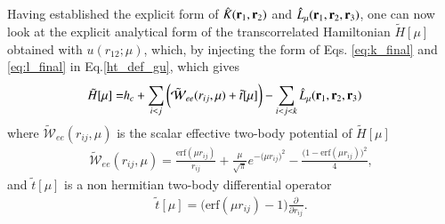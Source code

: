 \documentclass[aip,jcp,reprint,noshowkeys,superscriptaddress]{revtex4-1}
\newcommand{\deriv}[3]{\frac{\partial^{#3} #1}{\partial {#2}^{#3}}}
\newcommand{\bri}[1]{{\bf r}_{#1}}
\begin{document}
Having established the explicit form of $\hat{K}(\bri{1},\bri{2})$ and $\hat{L}_\mu(\bri{1},\bri{2},\bri{3})$, one can now 
look at the explicit analytical form of the transcorrelated Hamiltonian $\tilde{H}[\mu]$ obtained with $u(r_{12};\mu)$,  
which, by injecting the form of Eqs. \eqref{eq:k_final} and \eqref{eq:l_final} in Eq.\eqref{ht_def_gu}, which gives
\begin{equation}
  \begin{aligned}
 \label{eq:exp_ht_mu}
   \tilde{H}[\mu] = & h_c + \sum_{i<j} \bigg( \tilde{\mathcal{W}}_{ee}(r_{ij},\mu) + \tilde{t}[\mu] \bigg) - \sum_{i<j<k} \hat{L}_\mu(\bri{1},\bri{2},\bri{3})
  \end{aligned}
\end{equation}
where $ \tilde{\mathcal{W}}_{ee}(r_{ij},\mu)$ is the scalar effective two-body potential of  $\tilde{H}[\mu]$
\begin{equation}
 \begin{aligned}
 \tilde{\mathcal{W}}_{ee}(r_{ij},\mu)  =  \frac{\text{erf}(\mu r_{ij})}{r_{ij}} + \frac{\mu}{\sqrt{\pi}} e^{-\big(\mu r_{ij} \big)^2} - \frac{\bigg(1 -     \text{erf}(\mu r_{ij}) \bigg)^2}{4}, 
 \end{aligned}
\end{equation}
and $\tilde{t}[\mu]$ is a non hermitian two-body differential operator 
\begin{equation}
 \begin{aligned}
 \tilde{t}[\mu] =  \bigg( \text{erf}(\mu r_{ij}) - 1\bigg) \deriv{}{r_{ij}}{}.
 \end{aligned}
\end{equation}
\end{document}
